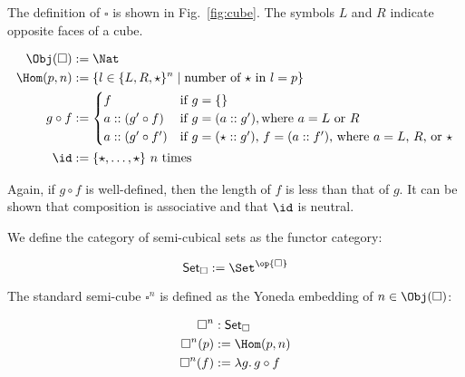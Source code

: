 \documentclass[10pt]{art.cls/art}
\newcommand{\Cube}{\ensuremath{\boldsymbol{\square}}}
\newcommand{\CSet}{\ensuremath{\mathsf{Set}_{\boldsymbol{\square}}}}
\newcommand{\kstar}{{\star}}
\begin{document}
\begin{definition}[\Cube]
  The definition of $\Cube$ is shown in Fig.~\ref{fig:cube}. The symbols $L$ and $R$ indicate opposite faces of a cube.
  \begin{figure*}[!t]
    \begin{align*}
      \Obj(\Cube) & := \Nat                                                                                \\
      \Hom(p, n)  & := \{l \in \{L, R, \kstar\}^n \mid \text{number of $\kstar$ in $l = p$}\}              \\
      g \circ f   & :=
      \begin{cases}
        f                  & \text{if $g = \{\}$}                                                            \\
        a :: (g' \circ f)  & \text{if $g = (a :: g')$}, \text{where $a = L$ or $R$}                          \\
        a :: (g' \circ f') & \text{if $g = (\star :: g')$, $f = (a :: f')$, where $a = L$, $R$, or $\kstar$} \\
      \end{cases} \\
      \id         & := \{\kstar, \ldots, \kstar\} \text{ $n$ times}
    \end{align*}
    \caption{Definition of \Cube}\label{fig:cube}
  \end{figure*}

  Again, if $g \circ f$ is well-defined, then the length of $f$ is less than that of $g$. It can be shown that composition is associative and that $\id$ is neutral.
\end{definition}

\begin{definition}[\CSet]
  We define the category of semi-cubical sets as the functor category:

  \begin{equation*}
    \CSet := \Set^{\op{\Cube}}
  \end{equation*}
\end{definition}

\begin{definition}[$\Cube^n$]
  The standard semi-cube $\Cube^n$ is defined as the Yoneda embedding of $n \in \Obj(\Cube)$:

  \begin{align*}
    \Cube^n    & : \CSet                    \\
    \Cube^n(p) & := \Hom(p, n)              \\
    \Cube^n(f) & := \lambda g .\, g \circ f
  \end{align*}
\end{definition}
\end{document}

